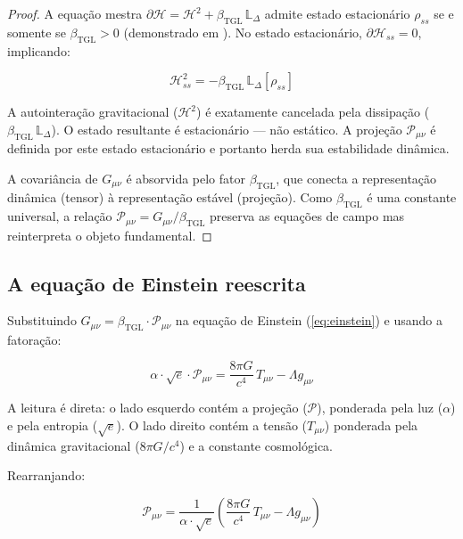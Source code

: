 \documentclass[12pt,a4paper,twoside]{article}
\newcommand{\betatgl}{\beta_{\!\scriptscriptstyle\mathrm{TGL}}}
\begin{document}
\begin{proof}
A equação mestra $\partial\mathcal{H} = \mathcal{H}^2 + \betatgl\,\mathbb{L}_\Delta$ admite estado estacionário $\rho_{ss}$ se e somente se $\betatgl > 0$ (demonstrado em \cite{Miguel2025Alpha2}). No estado estacionário, $\partial\mathcal{H}_{ss} = 0$, implicando:

\begin{equation}
\mathcal{H}_{ss}^2 = -\betatgl\,\mathbb{L}_\Delta[\rho_{ss}]
\end{equation}

A autointeração gravitacional ($\mathcal{H}^2$) é exatamente cancelada pela dissipação ($\betatgl\,\mathbb{L}_\Delta$). O estado resultante é estacionário --- não estático. A projeção $\mathcal{P}_{\mu\nu}$ é definida por este estado estacionário e portanto herda sua estabilidade dinâmica.

A covariância de $G_{\mu\nu}$ é absorvida pelo fator $\betatgl$, que conecta a representação dinâmica (tensor) à representação estável (projeção). Como $\betatgl$ é uma constante universal, a relação $\mathcal{P}_{\mu\nu} = G_{\mu\nu}/\betatgl$ preserva as equações de campo mas reinterpreta o objeto fundamental.
\end{proof}


\subsection{A equação de Einstein reescrita}

Substituindo $G_{\mu\nu} = \betatgl \cdot \mathcal{P}_{\mu\nu}$ na equação de Einstein (\ref{eq:einstein}) e usando a fatoração:

\begin{equationbox}[title={Equação de Einstein na TGL}]
\begin{equation}
\boxed{\alpha \cdot \sqrt{e} \cdot \mathcal{P}_{\mu\nu} = \frac{8\pi G}{c^4}\, T_{\mu\nu} - \Lambda g_{\mu\nu}}
\label{eq:einstein_tgl}
\end{equation}
\end{equationbox}

A leitura é direta: o lado esquerdo contém a projeção ($\mathcal{P}$), ponderada pela luz ($\alpha$) e pela entropia ($\sqrt{e}$). O lado direito contém a tensão ($T_{\mu\nu}$) ponderada pela dinâmica gravitacional ($8\pi G/c^4$) e a constante cosmológica.

Rearranjando:

\begin{equation}
\mathcal{P}_{\mu\nu} = \frac{1}{\alpha \cdot \sqrt{e}} \left(\frac{8\pi G}{c^4}\, T_{\mu\nu} - \Lambda g_{\mu\nu}\right)
\end{equation}
\end{document}
